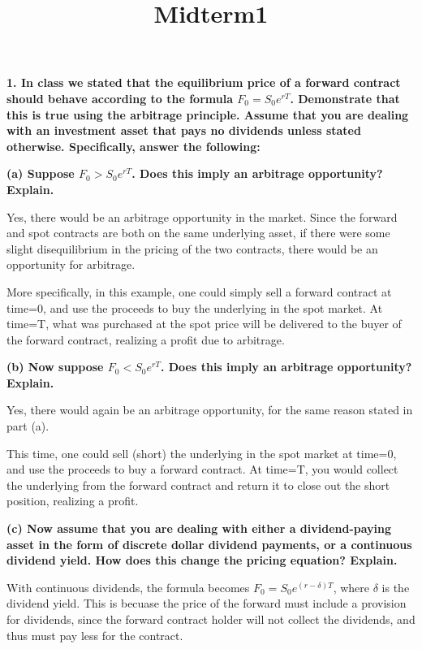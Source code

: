 \documentclass[11pt]{article}
\title{Midterm1}
\begin{document}
    
    
    \maketitle
    
    

    
    \textbf{1. In class we stated that the equilibrium price of a forward
contract should behave according to the formula \(F_0=S_0e^{rT}\).
Demonstrate that this is true using the arbitrage principle. Assume that
you are dealing with an investment asset that pays no dividends unless
stated otherwise. Specifically, answer the following:}

    \textbf{(a) Suppose \(F_0 > S_0e^{rT}\). Does this imply an arbitrage
opportunity? Explain.}

    Yes, there would be an arbitrage opportunity in the market. Since the
forward and spot contracts are both on the same underlying asset, if
there were some slight disequilibrium in the pricing of the two
contracts, there would be an opportunity for arbitrage.

More specifically, in this example, one could simply sell a forward
contract at time=0, and use the proceeds to buy the underlying in the
spot market. At time=T, what was purchased at the spot price will be
delivered to the buyer of the forward contract, realizing a profit due
to arbitrage.

    \textbf{(b) Now suppose \(F_0 < S_0e^{rT}\). Does this imply an
arbitrage opportunity? Explain.}

    Yes, there would again be an arbitrage opportunity, for the same reason
stated in part (a).

This time, one could sell (short) the underlying in the spot market at
time=0, and use the proceeds to buy a forward contract. At time=T, you
would collect the underlying from the forward contract and return it to
close out the short position, realizing a profit.

    \textbf{(c) Now assume that you are dealing with either a
dividend-paying asset in the form of discrete dollar dividend payments,
or a continuous dividend yield. How does this change the pricing
equation? Explain.}

    With continuous dividends, the formula becomes
\(F_0=S_0e^{(r- \delta) T}\), where \(\delta\) is the dividend yield.
This is becuase the price of the forward must include a provision for
dividends, since the forward contract holder will not collect the
dividends, and thus must pay less for the contract.
\end{document}
